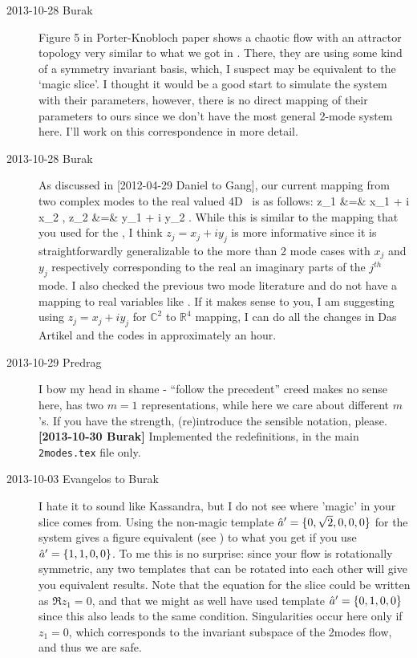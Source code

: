 \begin{description}
\item[2013-10-28 Burak] Figure 5 in Porter-Knobloch paper
shows a chaotic flow with an attractor topology very similar to what
we got in . There, they are using some kind of a
symmetry invariant basis, which, I suspect may be equivalent to the `magic slice'.
I thought it would be a good start to simulate the system with their parameters,
however, there is no direct mapping of their parameters to ours since we don't
have the most general 2-mode system here. I'll work on this correspondence in
more detail.

\item[2013-10-28 Burak] As discussed in [2012-04-29 Daniel to Gang], our current
mapping from two complex modes to the real valued 4D \statesp\ is as follows:
\bea
	z_1 &=& x_1 + i x_2 ,
	\continue
	z_2 &=& y_1 + i y_2 .
	\label{eq:C2toR4}
\eea
While this is similar to the mapping that you used for the {\cLe},
I think $z_j = x_j + i y_j$ is more informative since it is straightforwardly
generalizable to the more than 2 mode cases with $x_j$ and $y_j$  respectively
corresponding to the real an imaginary parts of the $j^{th}$ mode. I also
checked the previous two mode literature  and 
do not have a mapping to real variables like . If it makes
sense to you, I am suggesting using $z_j = x_j + i y_j$ for  $\mathbb{C}^2$
to $\mathbb{R}^4$ mapping, I can do all the changes in Das Artikel and the codes
in approximately an hour.

\item[2013-10-29 Predrag] I bow my head in shame - ``follow the
precedent'' creed makes no sense here, {\cLe} has two $m=1$
representations, while here we care about different $m$'s. If you
have the strength, (re)introduce the sensible notation, please.
\\
{\bf [2013-10-30 Burak]} Implemented the redefinitions, in the
main \texttt{2modes.tex} file only.



\item[2013-10-03 Evangelos to Burak]
I hate it to sound like Kassandra, but I do not see where 'magic' in
your slice comes from. Using the non-magic template
${\hat{a}'}=\{0,\sqrt{2},0,0,0\}$ for the {\twomode} system gives a figure
equivalent (see ) to what you get if you
use ${\hat{a}'}=\{1,1,0,0\}$. To me this is no surprise: since your flow
is rotationally symmetric, any two templates that can be rotated into
each other will give you equivalent results. Note that the equation
for the slice could be written as $\Re z_1=0$, and that we might as
well have used template ${\hat{a}'}=\{0,1,0,0\}$ since this also leads
to the same condition. Singularities occur here only if $z_1=0$,
which corresponds to the invariant subspace of the 2modes flow, and
thus we are safe.


\end{description}
